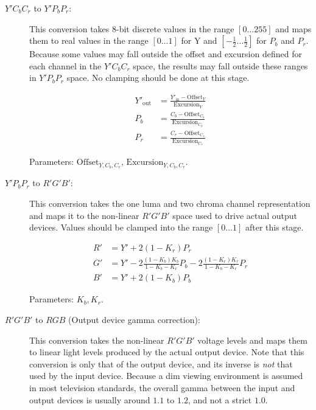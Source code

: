 \documentclass[9pt,letterpaper]{book}
\numberwithin{equation}{chapter}
\numberwithin{figure}{chapter}
\numberwithin{table}{chapter}
\begin{document}
\begin{description}
\item[$Y'C_bC_r$ to $Y'P_bP_r$:]
\vspace{\baselineskip}\hfill

This conversion takes 8-bit discrete values in the range $[0\ldots255]$ and
 maps them to real values in the range $[0\ldots1]$ for Y and
 $[-\frac{1}{2}\ldots\frac{1}{2}]$ for $P_b$ and $P_r$.
Because some values may fall outside the offset and excursion defined for each
 channel in the $Y'C_bC_r$ space, the results may fall outside these ranges in
 $Y'P_bP_r$ space.
No clamping should be done at this stage.

\begin{align}
Y'_\mathrm{out} & =
 \frac{Y'_\mathrm{in}-\mathrm{Offset}_Y}{\mathrm{Excursion}_Y} \\
P_b             & =
 \frac{C_b-\mathrm{Offset}_{C_b}}{\mathrm{Excursion}_{C_b}} \\
P_r             & =
 \frac{C_r-\mathrm{Offset}_{C_r}}{\mathrm{Excursion}_{C_r}}
\end{align}

Parameters: $\mathrm{Offset}_{Y,C_b,C_r}$, $\mathrm{Excursion}_{Y,C_b,C_r}$.

\item[$Y'P_bP_r$ to $R'G'B'$:]
\vspace{\baselineskip}\hfill

This conversion takes the one luma and two chroma channel representation and
 maps it to the non-linear $R'G'B'$ space used to drive actual output devices.
Values should be clamped into the range $[0\ldots1]$ after this stage.

\begin{align}
R' & = Y'+2(1-K_r)P_r \\
G' & = Y'-2\frac{(1-K_b)K_b}{1-K_b-K_r}P_b-2\frac{(1-K_r)K_r}{1-K_b-K_r}P_r\\
B' & = Y'+2(1-K_b)P_b
\end{align}

Parameters: $K_b,K_r$.

\item[$R'G'B'$ to $RGB$ (Output device gamma correction):]
\vspace{\baselineskip}\hfill

This conversion takes the non-linear $R'G'B'$ voltage levels and maps them to
 linear light levels produced by the actual output device.
Note that this conversion is only that of the output device, and its inverse is
 {\em not} that used by the input device.
Because a dim viewing environment is assumed in most television standards, the
 overall gamma between the input and output devices is usually around $1.1$ to
 $1.2$, and not a strict $1.0$.


\end{description}
\end{document}
